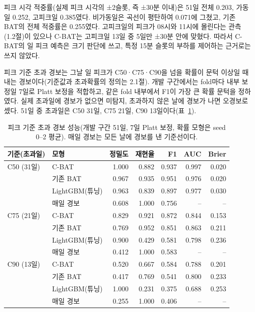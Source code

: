 피크 시각 적중률(실제 피크 시각의 ±2슬롯, 즉 ±30분 이내)은 51일 전체 0.203, 가동일 0.252, 고피크일 0.385였다. 비가동일은 곡선이 평탄하여 0.071에 그쳤고, 기존 BAT의 전체 적중률은 0.255였다. 고피크일의 피크가 08시와 11시에 몰린다는 관측(1.2절)이 있으나 C-BAT는 고피크일 13일 중 5일만 ±30분 안에 맞혔다. 따라서 C-BAT의 일 피크 예측은 크기 판단에 쓰고, 특정 15분 슬롯의 부하를 제어하는 근거로는 쓰지 않았다.


피크 기준 초과 경보는 그날 일 피크가 C50·C75·C90을 넘을 확률이 문턱 이상일 때 내는 경보이다(기준값과 초과확률의 정의는 2.1절). 개발 구간에서는 fold마다 내부 보정일 7일로 Platt 보정을 적합하고, 같은 fold 내부에서 F1이 가장 큰 확률 문턱을 정하였다. 실제 초과일에 경보가 없으면 미탐지, 초과하지 않은 날에 경보가 나면 오경보로 셌다. 51일 중 초과일은 C50 31일, C75 21일, C90 13일이다(표~\ref{tab:ch3-alarm}).

\begin{table}[htbp]
\centering
\hwptablefont
\caption{피크 기준 초과 경보 성능(개발 구간 51일, 7일 Platt 보정, 확률 모형은 seed 0--2 평균). 매일 경보는 모든 날에 경보를 낸 기준선이다.}\label{tab:ch3-alarm}
\begin{tabular}{llrrrrr}
\toprule
기준(초과일) & 모형 & 정밀도 & 재현율 & F1 & AUC & Brier \\
\midrule
C50 (31일) & C-BAT & 1.000 & 0.882 & 0.937 & 0.997 & 0.020 \\
 & 기존 BAT & 0.967 & 0.935 & 0.951 & 0.976 & 0.020 \\
 & LightGBM(튜닝) & 0.963 & 0.839 & 0.897 & 0.977 & 0.030 \\
 & 매일 경보 & 0.608 & 1.000 & 0.756 & -- & -- \\
\midrule
C75 (21일) & C-BAT & 0.829 & 0.921 & 0.872 & 0.844 & 0.153 \\
 & 기존 BAT & 0.769 & 0.952 & 0.851 & 0.863 & 0.211 \\
 & LightGBM(튜닝) & 0.900 & 0.429 & 0.581 & 0.798 & 0.236 \\
 & 매일 경보 & 0.412 & 1.000 & 0.583 & -- & -- \\
\midrule
C90 (13일) & C-BAT & 0.520 & 0.667 & 0.584 & 0.788 & 0.201 \\
 & 기존 BAT & 0.417 & 0.769 & 0.541 & 0.800 & 0.233 \\
 & LightGBM(튜닝) & 1.000 & 0.231 & 0.375 & 0.688 & 0.253 \\
 & 매일 경보 & 0.255 & 1.000 & 0.406 & -- & -- \\
\bottomrule
\end{tabular}
\end{table}

